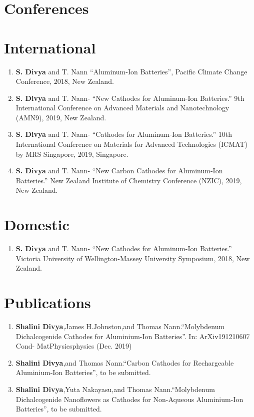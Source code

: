 \section*{\centering Conferences}
\section*{International}
\begin{enumerate}
    \item \textbf{S. Divya} and T. Nann \enquote{Aluminum-Ion Batteries}, Pacific Climate Change Conference, 2018, New Zealand.
    \item \textbf{S. Divya} and T. Nann- \enquote{New Cathodes for Aluminum-Ion Batteries.} 9th International Conference on Advanced Materials and Nanotechnology (AMN9), 2019, New Zealand.
    \item \textbf{S. Divya} and T. Nann- \enquote{Cathodes for Aluminum-Ion Batteries.} 10th International Conference on Materials for Advanced Technologies (ICMAT) by MRS Singapore, 2019, Singapore.
     \item \textbf{S. Divya} and T. Nann- \enquote{New Carbon Cathodes for Aluminum-Ion Batteries.} New Zealand Institute of Chemistry Conference (NZIC), 2019, New Zealand.
\end{enumerate}
\section*{Domestic}   
\begin{enumerate}
     \item \textbf{S. Divya} and T. Nann- \enquote{New Cathodes for Aluminum-Ion Batteries.} Victoria University of Wellington-Massey University Symposium, 2018, New Zealand.
\end{enumerate}

\section*{\centering Publications}
\begin{enumerate}
    \item \textbf{Shalini Divya},James H.Johnston,and Thomas Nann.“Molybdenum Dichalcogenide Cathodes for Aluminium-Ion Batteries”. In: ArXiv191210607 Cond- MatPhysicsphysics (Dec. 2019) %
    \item \textbf{Shalini Divya},and Thomas Nann.“Carbon Cathodes for Rechargeable Aluminium-Ion Batteries”, to be submitted.
    \item \textbf{Shalini Divya},Yuta Nakayasu,and Thomas Nann.“Molybdenum Dichalcogenide Nanoflowers as Cathodes for Non-Aqueous Aluminium-Ion Batteries”, to be submitted.
\end{enumerate}